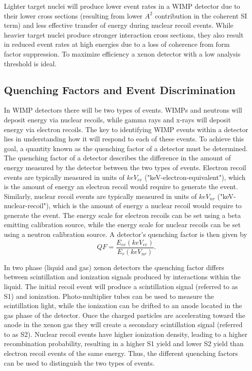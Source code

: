 \documentclass[a4paper,12pt]{article}
\begin{document}
Lighter target nuclei will produce lower event rates in a WIMP detector due to their lower cross sections (resulting from lower $A^2$ contribution in the coherent SI term) and less effective transfer of energy during nuclear recoil events. While heavier target nuclei produce stronger interaction cross sections, they also result in reduced event rates at high energies due to a loss of coherence from form factor suppression.  To maximize efficiency a xenon detector with a low analysis threshold is ideal.

\subsection{Quenching Factors and Event Discrimination}
In WIMP detectors there will be two types of events.  WIMPs and neutrons will deposit energy via nuclear recoils, while gamma rays and x-rays will deposit energy via electron recoils.  The key to identifying WIMP events within a detector lies in understanding how it will respond to each of these events.  To achieve this goal, a quantity known as the quenching factor of a detector must be determined.  The quenching factor of a detector describes the difference in the amount of energy measured by the detector between the two types of events.  Electron recoil events are typically measured in units of $keV_{ee}$ ("keV-electron-equivalent"), which is the amount of energy an electron recoil would require to generate the event.  Similarly, nuclear recoil events are typically measured in units of $keV_{nr}$ ("keV-nuclear-recoil"), which is the amount of energy a nuclear recoil would require to generate the event.  The energy scale for electron recoils can be set using a beta emitting calibration source, while the energy scale for nuclear recoils can be set using a neutron calibration source.  A detector's quenching factor is then given by
\[QF=\frac{E_{ee}(keV_{ee})}{E_r(keV_{nr})}.\]

In two phase (liquid and gas) xenon detectors the quenching factor differs between scintillation and ionization signals produced by interactions within the liquid.  The initial recoil event will produce a scintillation signal (referred to as S1) and ionization.  Photo-multiplier tubes can be used to measure the scintillation light, while the ionization can be drifted to an anode located in the gas phase of the detector.  Once the charged particles are accelerating toward the anode in the xenon gas they will create a secondary scintillation signal (referred to as S2).  Nuclear recoil events have higher ionization density, leading to a higher recombination probability, resulting in a higher S1 yield and lower S2 yield than electron recoil events of the same energy. Thus, the different quenching factors can be used to distinguish the two types of events.
\end{document}
